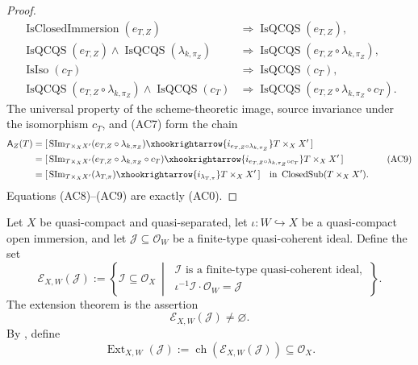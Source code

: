 \begin{proof}
  \[
  \begin{aligned}
    \operatorname{IsClosedImmersion}(e_{T,Z})
      &\Longrightarrow\operatorname{IsQCQS}(e_{T,Z}),\\
    \operatorname{IsQCQS}(e_{T,Z})\wedge
      \operatorname{IsQCQS}(\lambda_{k,\pi_Z})
      &\Longrightarrow
        \operatorname{IsQCQS}(e_{T,Z}\circ\lambda_{k,\pi_Z}),\\
    \operatorname{IsIso}(c_T)
      &\Longrightarrow\operatorname{IsQCQS}(c_T),\\
    \operatorname{IsQCQS}(e_{T,Z}\circ\lambda_{k,\pi_Z})\wedge
      \operatorname{IsQCQS}(c_T)
      &\Longrightarrow
        \operatorname{IsQCQS}
          (e_{T,Z}\circ\lambda_{k,\pi_Z}\circ c_T).
  \end{aligned}                                                     \tag{AC8a}
  \]
  The universal property of the scheme-theoretic image,
  source invariance under the isomorphism $c_T$, and (AC7) form the chain
  \[
  \begin{aligned}
    \mathsf A_Z(T)
      &=[\,\operatorname{SIm}_{T\times_XX'}
          (e_{T,Z}\circ\lambda_{k,\pi_Z})
        \xhookrightarrow{i_{e_{T,Z}\circ\lambda_{k,\pi_Z}}}
          T\times_XX'\,]\\
      &=[\,\operatorname{SIm}_{T\times_XX'}
          (e_{T,Z}\circ\lambda_{k,\pi_Z}\circ c_T)
        \xhookrightarrow{i_{e_{T,Z}\circ\lambda_{k,\pi_Z}\circ c_T}}
          T\times_XX'\,]\\
      &=[\,\operatorname{SIm}_{T\times_XX'}(\lambda_{T,\pi})
        \xhookrightarrow{i_{\lambda_{T,\pi}}}T\times_XX'\,]
      \quad\text{in }\operatorname{ClosedSub}(T\times_XX').
  \end{aligned}                                                   \tag{AC9}
  \]
  Equations (AC8)--(AC9) are exactly (AC0).
\end{proof}

\begin{definition}
  \label{def:nagata-finite-type-ideal-extension}

  Let $X$ be quasi-compact and quasi-separated, let
  $\iota\colon W\hookrightarrow X$ be a quasi-compact open immersion, and let
  $\mathcal J\subseteq\mathcal O_W$ be a finite-type quasi-coherent ideal.
  Define the set
  \[
    \mathscr E_{X,W}(\mathcal J)
      :=\left\{
        \mathcal I\subseteq\mathcal O_X\
        \middle|\
        \begin{array}{l}
          \mathcal I\text{ is a finite-type quasi-coherent ideal},\\
          \iota^{-1}\mathcal I\cdot\mathcal O_W=\mathcal J
        \end{array}\right\}.
  \]
  The extension theorem
  \cite[\href{https://stacks.math.columbia.edu/tag/01PF}{Tag 01PF}]
    {stacks-project} is the assertion
  \[
    \mathscr E_{X,W}(\mathcal J)\neq\varnothing.
  \]
  By , define
  \[
    \operatorname{Ext}_{X,W}(\mathcal J)
      :=\operatorname{ch}(\mathscr E_{X,W}(\mathcal J))
      \subseteq\mathcal O_X.
  \]
\end{definition}

